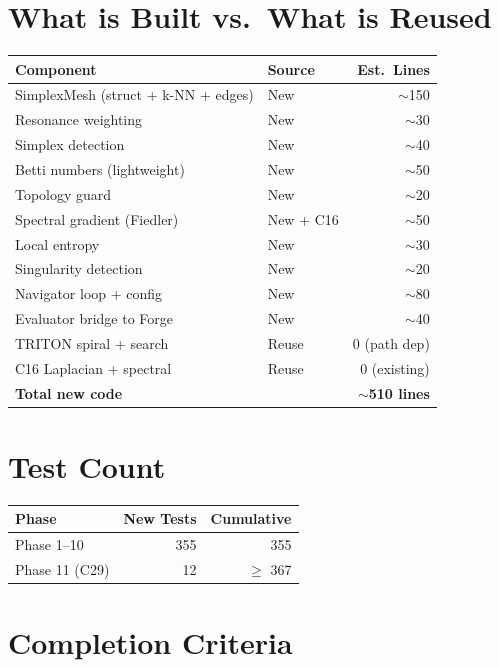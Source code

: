 \documentclass[11pt,a4paper,twoside]{article}
\theoremstyle{definition}
\theoremstyle{plain}
\theoremstyle{remark}
\begin{document}
\section{What is Built vs.\ What is Reused}

\begin{tabular}{l l r}
\toprule
\textbf{Component} & \textbf{Source} & \textbf{Est.\ Lines} \\
\midrule
SimplexMesh (struct + k-NN + edges) & New & $\sim$150 \\
Resonance weighting & New & $\sim$30 \\
Simplex detection & New & $\sim$40 \\
Betti numbers (lightweight) & New & $\sim$50 \\
Topology guard & New & $\sim$20 \\
Spectral gradient (Fiedler) & New + C16 & $\sim$50 \\
Local entropy & New & $\sim$30 \\
Singularity detection & New & $\sim$20 \\
Navigator loop + config & New & $\sim$80 \\
Evaluator bridge to Forge & New & $\sim$40 \\
\midrule
TRITON spiral + search & Reuse & 0 (path dep) \\
C16 Laplacian + spectral & Reuse & 0 (existing) \\
\midrule
\textbf{Total new code} & & $\sim$\textbf{510 lines} \\
\bottomrule
\end{tabular}

\section{Test Count}

\begin{tabular}{l r r}
\toprule
\textbf{Phase} & \textbf{New Tests} & \textbf{Cumulative} \\
\midrule
Phase 1--10 & 355 & 355 \\
Phase 11 (C29) & 12 & $\ge$ 367 \\
\bottomrule
\end{tabular}

\section{Completion Criteria}
\end{document}
